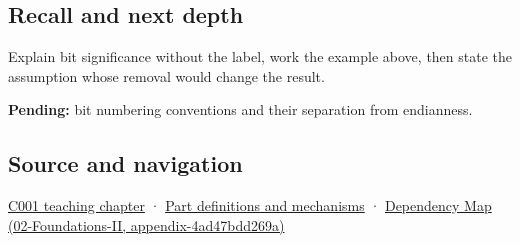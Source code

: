 \subsection{Recall and next depth}\label{recall-and-next-depth}

Explain bit significance without the label, work the example above, then state the assumption whose removal would change the result.

\textbf{Pending:} bit numbering conventions and their separation from endianness.

\subsection{Source and navigation}\label{source-and-navigation}

\href{Continuous\%20Notes/Computing\%20Foundations\%20-\%20From\%20Bits\%20to\%20C++\%20and\%20Systems\%20APIs\#From\%20a\%20signal\%20to\%20an\%20interpretation}{C001 teaching chapter} · \hyperref[appendix-fd090d982a15]{Part definitions and mechanisms} · \href{}{Dependency Map (02-Foundations-II, appendix-4ad47bdd269a)}
